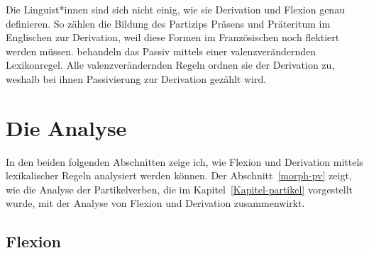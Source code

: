\noindent
Die Linguist*innen sind sich nicht einig, wie sie Derivation und Flexion genau definieren.
So zählen \citet*[--264]{SWB2003a} die Bildung des Partizips Präsens und Präteritum im Englischen
zur Derivation, weil diese Formen im Französischen noch flektiert werden müssen.
\citet*[]{SWB2003a} behandeln das Passiv mittels einer valenzverändernden Lexikonregel.
Alle valenzverändernden Regeln ordnen sie der Derivation zu, weshalb bei ihnen Passivierung
zur Derivation gezählt wird.

\section{Die Analyse}

In den beiden folgenden Abschnitten zeige ich, wie Flexion und Derivation mittels lexikalischer Regeln
analysiert werden können. Der Abschnitt~\ref{morph-pv} zeigt, wie die Analyse der Partikelverben, die
im Kapitel~\ref{Kapitel-partikel} vorgestellt wurde, mit der Analyse von Flexion und Derivation zusammenwirkt.
\largerpage

\subsection{Flexion}
\label{sec-morph-flex-anal}
\label{sec-inflection-hpsg}

